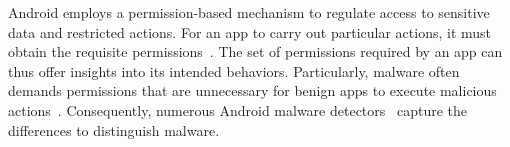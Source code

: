 

Android employs a permission-based mechanism to regulate access to sensitive data and restricted actions.
For an app to carry out particular actions, it must obtain the requisite permissions~\cite{au2012pscout,backes2016demystifying}.
The set of permissions required by an app can thus offer insights into its intended behaviors.
Particularly, malware often demands permissions that are unnecessary for benign apps to execute malicious actions~\cite{enck2009lightweight}.
Consequently, numerous Android malware detectors~\cite{he2022msdroid,xu2018deeprefiner,arp2014drebin,kim2018multimodal,wu2021android} capture the differences to distinguish malware. 




